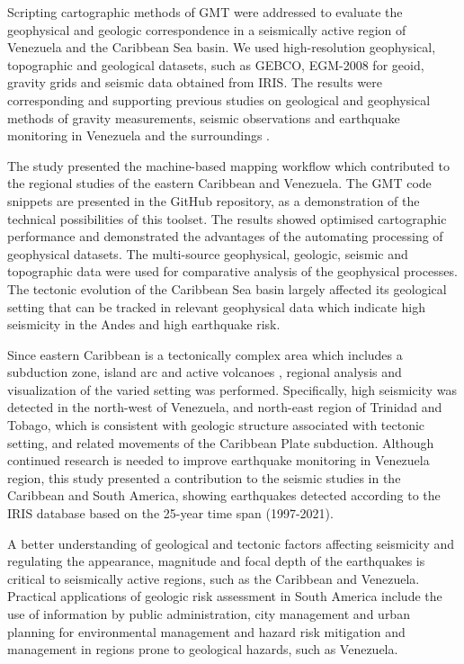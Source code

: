 \documentclass[sustainability,article,submit,pdftex,moreauthors]{Definitions/mdpi}
\begin{document}
Scripting cartographic methods of GMT were addressed to evaluate the geophysical and geologic correspondence in a seismically active region of Venezuela and the Caribbean Sea basin. We used high-resolution geophysical, topographic and geological datasets, such as GEBCO, EGM-2008 for geoid, gravity grids and seismic data obtained from IRIS. The results were corresponding and supporting previous studies on geological and geophysical methods of gravity measurements, seismic observations and earthquake monitoring in Venezuela and the surroundings \citep{Guenther,Schmitz2008}.  

The study presented the machine-based mapping workflow which contributed to the regional studies of the eastern Caribbean and Venezuela. The GMT code snippets are presented in the GitHub repository, as a demonstration of the technical possibilities of this toolset. The results showed optimised cartographic performance and demonstrated the advantages of the automating processing of geophysical datasets. The multi-source geophysical, geologic, seismic and topographic data were used for comparative analysis of the geophysical processes. The tectonic evolution of the Caribbean Sea basin largely affected its geological setting that can be tracked in relevant geophysical data which indicate high seismicity in the Andes and high earthquake risk.

Since eastern Caribbean is a tectonically complex area which includes a subduction zone, island arc and active volcanoes \cite{Ambeh}, regional analysis and visualization of the varied setting was performed. Specifically, high seismicity was detected in the north-west of Venezuela, and north-east region of Trinidad and Tobago, which is consistent with geologic structure associated with tectonic setting, and related movements of the Caribbean Plate subduction. Although continued research is needed to improve earthquake monitoring in Venezuela region, this study presented a contribution to the seismic studies in the Caribbean and South America, showing earthquakes detected according to the IRIS database based on the 25-year time span (1997-2021). 

A better understanding of geological and tectonic factors affecting seismicity and regulating the appearance, magnitude and focal depth of the earthquakes is critical to seismically active regions, such as the Caribbean and Venezuela. Practical applications of geologic risk assessment in South America include the use of information by public administration, city management and urban planning for environmental management and hazard risk mitigation and management in regions prone to geological hazards, such as Venezuela. 
\end{document}
